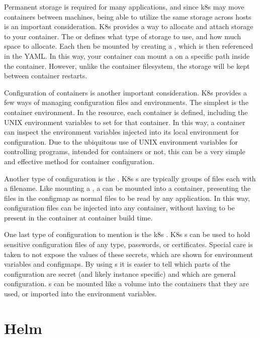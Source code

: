 \documentclass[11pt,twoside]{article}
\begin{document}
Permanent storage is required for many applications, and since k8s may move containers
between machines, being able to utilize the same storage across hosts is an important
consideration.  K8s provides a way to allocate and attach storage to your container.
The  or  defines what type of storage to use, and how
much space to allocate.  Each  then be mounted by creating a , which is then referenced in the  YAML.  In this way, your
container can mount a  on a specific path inside the container.
However, unlike the container filesystem, the 
storage will be kept between container restarts.

Configuration of containers is another important consideration.  K8s provides a few ways of
managing configuration files and environments.  The
simplest is the container environment.  In the  resource, each container
is defined, including the UNIX environment variables to set for that container.  In this
way, a container can inspect the environment variables injected into its local environment
for configuration.  Due to the ubiquitous use of UNIX environment variables for controlling
programs, intended for containers or not, this can be a very simple and effective method
for container configuration.

Another type of configuration is the .  K8s s are typically
groups of files each with a filename.  Like mounting a , a 
can be mounted into a container, presenting the files in the configmap as normal files to be
read by any application.  In this way, configuration files can be injected into any container,
without having to be present in the container at container build time.

One last type of configuration to mention is the k8s .  K8s s can
be used to hold sensitive configuration files of any type, passwords, or certificates.  Special
care is taken to not expose the values of these secrets, which are shown for
environment variables and configmaps.  By using s it is easier to tell which
parts of the configuration are secret (and likely instance specific) and which are general
configuration.  s can be mounted like a volume into the containers
that they are used, or imported into the environment variables.

\section{Helm}
\end{document}
